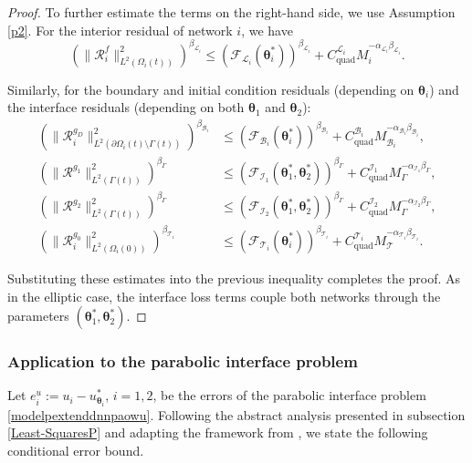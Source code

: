 \documentclass{article}
\newtheorem{proof}{Proof}[section]
\begin{document}
\begin{proof}
To further estimate the terms on the right-hand side, we use Assumption \ref{p2}. For the interior residual of network $i$, we have
\begin{equation}
\left(\|\mathcal{R}^f_i\|^2_{L^2(\Omega_i(t))}\right)^{\beta_{\mathcal{L}_i}} \leq (\mathcal{F}_{\mathcal{L}_i}(\boldsymbol{\theta}_i^*))^{\beta_{\mathcal{L}_i}} + C_{\text{quad}}^{\mathcal{L}_i}M_{i}^{-\alpha_{\mathcal{L}_i}\beta_{\mathcal{L}_i}}.
\end{equation}

Similarly, for the boundary and initial condition residuals (depending on $\boldsymbol{\theta}_i$) and the interface residuals (depending on both $\boldsymbol{\theta}_1$ and $\boldsymbol{\theta}_2$):
\begin{equation}
\begin{aligned}
\left(\|\mathcal{R}^{g_D}_i\|^2_{L^2(\partial\Omega_i(t) \setminus \Gamma(t))}\right)^{\beta_{\mathcal{B}_i}} &\leq (\mathcal{F}_{\mathcal{B}_i}(\boldsymbol{\theta}_i^*))^{\beta_{\mathcal{B}_i}} + C_{\text{quad}}^{\mathcal{B}_i}M_{\mathcal{B}_i}^{-\alpha_{\mathcal{B}_i}\beta_{\mathcal{B}_i}},  \\
\left(\|\mathcal{R}^{g_1}\|^2_{L^2(\Gamma(t))}\right)^{\beta_{\Gamma}} &\leq (\mathcal{F}_{\mathcal{I}_1}(\boldsymbol{\theta}_1^*, \boldsymbol{\theta}_2^*))^{\beta_{\Gamma}} + C_{\text{quad}}^{\mathcal{I}_1}M_{\Gamma}^{-\alpha_{\mathcal{I}_1}\beta_{\Gamma}},\\
\left(\|\mathcal{R}^{g_2}\|^2_{L^2(\Gamma(t))}\right)^{\beta_{\Gamma}} &\leq (\mathcal{F}_{\mathcal{I}_2}(\boldsymbol{\theta}_1^*, \boldsymbol{\theta}_2^*))^{\beta_{\Gamma}} + C_{\text{quad}}^{\mathcal{I}_2}M_{\Gamma}^{-\alpha_{\mathcal{I}_2}\beta_{\Gamma}},\\
\left(\|\mathcal{R}^{g_0}_i\|^2_{L^2(\Omega_i(0) )}\right)^{\beta_{\mathcal{T}_i}} &\leq (\mathcal{F}_{\mathcal{T}_i}(\boldsymbol{\theta}_i^*))^{\beta_{\mathcal{T}_i}} + C_{\text{quad}}^{\mathcal{T}_i}M_{\mathcal{T}}^{-\alpha_{\mathcal{T}_i}\beta_{\mathcal{T}_i}}.
\end{aligned}
\end{equation}

Substituting these estimates into the previous inequality completes the proof. As in the elliptic case, the interface loss terms couple both networks through the parameters $(\boldsymbol{\theta}_1^*, \boldsymbol{\theta}_2^*)$.
\end{proof}

\subsubsection{Application to the parabolic interface problem}
Let $e^u_i := u_i - u_{\boldsymbol{\theta}_i}^{*}$, $i = 1, 2$, be the errors of the parabolic interface problem \eqref{modelpextenddnnpaowu}. Following the abstract analysis presented in subsection \ref{Least-SquaresP} and adapting the framework from \cite{mishra2023estimates}, we state the following conditional error bound.
\end{document}
